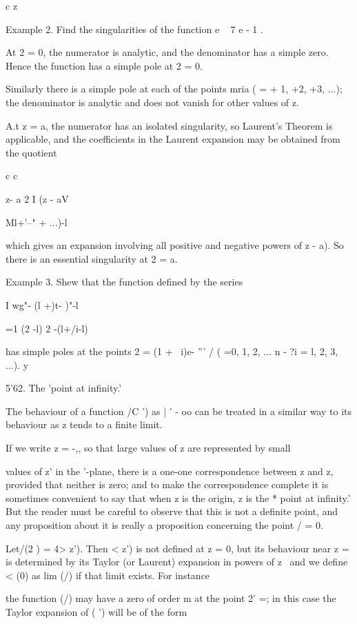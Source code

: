 {{{{c z\

Example 2. Find the singularities of the function e ~ 7 e - 1 .

At 2 = 0, the numerator is analytic, and the denominator has a simple
zero. Hence the function has a simple pole at 2 = 0.

Similarly there is a simple pole at each of the points mria ( = + 1,
+2, +3, ...); the denominator is analytic and does not vanish for
other values of z.

A.t z = a, the numerator has an isolated singularity, so Laurent's
Theorem is applicable, and the coefficients in the Laurent expansion
may be obtained from the quotient

c c

z- a 2 I (z - aV

Ml+'--" + ...)-l

which gives an expansion involving all positive and negative powers of
z - a). So there is an essential singularity at 2 = a.

Example 3. Shew that the function defined by the series

I wg"- (l +)t- )"-l

 =1 (2 -l) 2 -(l+/i-l)

has simple poles at the points 2 = (1 + ~i)e- ''' / ( =0, 1, 2, ... n
- \; ?i = l, 2, 3, ...). y 

5'62. The 'point at infinity.'

The behaviour of a function /C ') as | ' - oo can be treated in a
similar way to its behaviour as z tends to a finite limit.

If we write z = -,, so that large values of z are represented by small

values of z' in the '-plane, there is a one-one correspondence between
z and z, provided that neither is zero; and to make the
correspondence complete it is sometimes convenient to say that when z
is the origin, z is the * point at infinity.' But the reader must be
careful to observe that this is not a definite point, and any
proposition about it is really a proposition concerning the point / =
0.

Let/(2 ) = 4> z'). Then < z') is not defined at z = 0, but its
behaviour near z = is determined by its Taylor (or Laurent) expansion
in powers of z \ and we define < (0) as lim (/) if that limit exists.
For instance

the function (/) may have a zero of order m at the point 2' =; in
this case the Taylor expansion of ( ') will be of the form

}}}}
